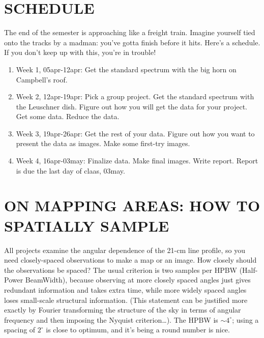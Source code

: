 \documentclass[preprint]{aastex}
\begin{document}
\section{SCHEDULE}

The end of the semester is approaching like a freight train. Imagine
yourself tied onto the tracks by a madman: you've gotta finish before it
hits. Here's a schedule. If you don't keep up with this, you're in
trouble! \begin{enumerate}

\item Week 1, 05apr-12apr: Get the standard spectrum with the big horn
  on Campbell's roof.

\item Week 2, 12apr-19apr: Pick a group project. Get the standard
  spectrum with the Leuschner dish. Figure out how you will get the data
  for your project. Get some data. Reduce the data.

\item Week 3, 19apr-26apr: Get the rest of your data. Figure out
  how you want to present the data as images. Make some first-try
  images. 

\item Week 4, 16apr-03may: Finalize data. Make final images. Write
report. Report is due the last day of claas, 03may.
\end{enumerate}


\section{ON MAPPING AREAS: HOW TO SPATIALLY SAMPLE} \label{sampling} 

All projects examine the angular dependence of the 21-cm line profile,
so you need closely-spaced observations to make a map or an image. How
closely should the observations be spaced?  The usual criterion is two
samples per HPBW (Half-Power BeamWidth), because observing at more
closely spaced angles just gives redundant information and takes extra
time, while more widely spaced angles loses small-scale structural
information. (This statement can be justified more exactly by Fourier
transforming the structure of the sky in terms of angular frequency and
then imposing the Nyquist criterion\dots).  The HPBW is $\sim 4^\circ$;
using a spacing of $2^\circ$ is close to optimum, and it's being a round
number is nice.
\end{document}
